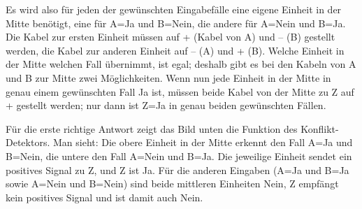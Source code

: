 {{{\centering%
\par}

Es wird also für jeden der gewünschten Eingabefälle eine eigene Einheit in der Mitte benötigt, eine für A=Ja und B=Nein, die andere für A=Nein und B=Ja.  Die Kabel zur ersten Einheit müssen auf + (Kabel von A) und – (B) gestellt werden, die Kabel zur anderen Einheit auf – (A) und + (B).  Welche Einheit in der Mitte welchen Fall übernimmt, ist egal; deshalb gibt es bei den Kabeln von A und B zur Mitte zwei Möglichkeiten.  Wenn nun jede Einheit in der Mitte in genau einem gewünschten Fall Ja ist, müssen beide Kabel von der Mitte zu Z auf + gestellt werden; nur dann ist Z=Ja in genau beiden gewünschten Fällen.

Für die erste richtige Antwort zeigt das Bild unten die Funktion des Konflikt-Detektors. Man sieht: Die obere Einheit in der Mitte erkennt den Fall A=Ja und B=Nein, die untere den Fall A=Nein und B=Ja. Die jeweilige Einheit sendet ein positives Signal zu Z, und Z ist Ja. Für die anderen Eingaben (A=Ja und B=Ja sowie A=Nein und B=Nein) sind beide mittleren Einheiten Nein, Z empfängt kein positives Signal und ist damit auch Nein.

{\centering%
\raisebox{-0.5ex}{} \raisebox{-0.5ex}{}

\raisebox{-0.5ex}{} \raisebox{-0.5ex}{}\par}



}}

